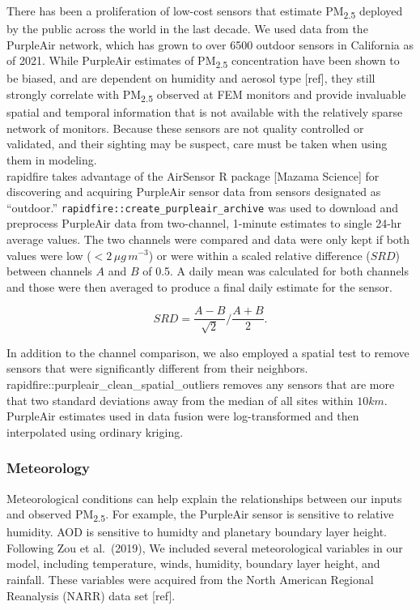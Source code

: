 \documentclass[gmd, manuscript]{copernicus}
\begin{document}
There has been a proliferation of low-cost sensors that estimate
PM\textsubscript{2.5} deployed by the public across the world in the
last decade. We used data from the PurpleAir network, which has grown to
over 6500 outdoor sensors in California as of 2021. While PurpleAir
estimates of PM\textsubscript{2.5} concentration have been shown to be
biased, and are dependent on humidity and aerosol type {[}ref{]}, they
still strongly correlate with PM\textsubscript{2.5} observed at FEM
monitors and provide invaluable spatial and temporal information that is
not available with the relatively sparse network of monitors. Because
these sensors are not quality controlled or validated, and their
sighting may be suspect, care must be taken when using them in
modeling.\\
rapidfire takes advantage of the AirSensor R package {[}Mazama
Science{]} for discovering and acquiring PurpleAir sensor data from
sensors designated as ``outdoor.''
\texttt{rapidfire::create\_purpleair\_archive} was used to download and
preprocess PurpleAir data from two-channel, 1-minute estimates to single
24-hr average values. The two channels were compared and data were only
kept if both values were low (\(<2\,\unit{\mu g\,m^{-3}}\)) or were
within a scaled relative difference (\(SRD\)) between channels \(A\) and
\(B\) of 0.5. A daily mean was calculated for both channels and those
were then averaged to produce a final daily estimate for the sensor.

\begin{equation}
SRD=\frac{A-B}{\sqrt{2}}/\frac{A+B}{2}.  
\end{equation}

In addition to the channel comparison, we also employed a spatial test
to remove sensors that were significantly different from their
neighbors. rapidfire::purpleair\_clean\_spatial\_outliers removes any
sensors that are more that two standard deviations away from the median
of all sites within \(10\unit {km}\). PurpleAir estimates used in data
fusion were log-transformed and then interpolated using ordinary
kriging.

\subsubsection{Meteorology}

Meteorological conditions can help explain the relationships between our
inputs and observed PM\textsubscript{2.5}. For example, the PurpleAir
sensor is sensitive to relative humidity. AOD is sensitive to humidty
and planetary boundary layer height. Following Zou et al.~(2019), We
included several meteorological variables in our model, including
temperature, winds, humidity, boundary layer height, and rainfall. These
variables were acquired from the North American Regional Reanalysis
(NARR) data set {[}ref{]}.
\end{document}
